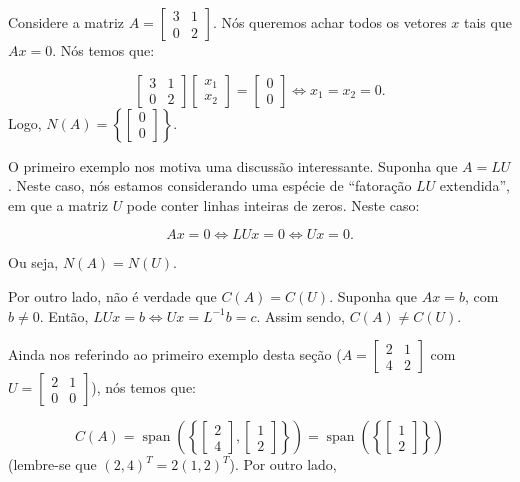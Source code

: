 \begin{Example}
	Considere a matriz $A = \begin{bmatrix}
		3 & 1 \\
		0 & 2
	\end{bmatrix}$. Nós queremos achar todos os vetores $x$ tais que $Ax = 0$. Nós temos que:
	
	$$
	\begin{bmatrix}
		3 & 1 \\
		0 & 2
	\end{bmatrix}
	\begin{bmatrix}
		x_1 \\
		x_2
	\end{bmatrix}
	=
	\begin{bmatrix}
		0 \\
		0
	\end{bmatrix}
	\iff
	x_1 = x_2 = 0.
	$$
	Logo, $N(A) = \left\{\begin{bmatrix}
		0 \\
		0
	\end{bmatrix}\right\}$.
\end{Example}

O primeiro exemplo nos motiva uma discussão interessante. Suponha que $A = LU$. Neste caso, nós estamos considerando uma espécie de ``fatoração $LU$ extendida'', em que a matriz $U$ pode conter linhas inteiras de zeros. Neste caso:

$$
Ax = 0 \iff LUx = 0 \iff Ux = 0.
$$

Ou seja, $N(A) = N(U)$.

Por outro lado, não é verdade que $C(A) = C(U)$. Suponha que $Ax = b$, com $b\neq 0$. Então, $LUx = b\iff Ux = L^{-1}b = c$. Assim sendo, $C(A)\neq C(U)$.

Ainda nos referindo ao primeiro exemplo desta seção ($A = \begin{bmatrix} 2 & 1 \\ 4 & 2 \end{bmatrix}$ com $U = \begin{bmatrix} 2 & 1 \\ 0 & 0 \end{bmatrix}$), nós temos que:

$$
C(A) = \operatorname{span}\left(\left\{\begin{bmatrix} 2 \\ 4 \end{bmatrix}, \begin{bmatrix} 1 \\ 2 \end{bmatrix}\right\}\right) = \operatorname{span}\left(\left\{\begin{bmatrix} 1 \\ 2 \end{bmatrix}\right\}\right)
$$
(lembre-se que $(2, 4)^T = 2(1, 2)^T$). Por outro lado,

